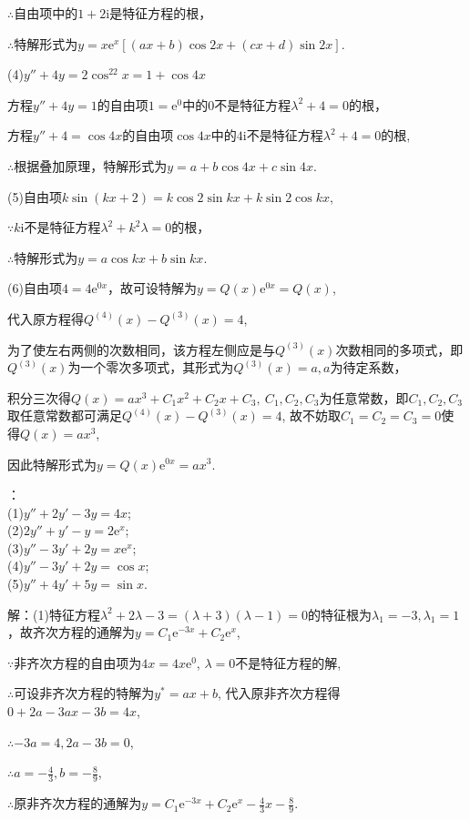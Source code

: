 \documentclass[12pt,UTF8,fleqn]{ctexart}
\newcommand{\me}[0]{\mathrm e}
\newcommand{\m}[0]{\mathrm }
\begin{document}
\begin{enumerate}
$\therefore$自由项中的$1+2\m i$是特征方程的根，

$\therefore$特解形式为$y=x\me^x[(ax+b)\cos2x+(cx+d)\sin2x]$.

(4)$y''+4y=2\cos^22x=1+\cos4x$

方程$y''+4y=1$的自由项$1=\me^0$中的$0$不是特征方程$\lambda^2+4=0$的根，

方程$y''+4=\cos4x$的自由项$\cos4x$中的$4\m i$不是特征方程$\lambda^2+4=0$的根,

$\therefore$根据叠加原理，特解形式为$y=a+b\cos4x+c\sin4x$.

(5)自由项$k\sin(kx+2)=k\cos2\sin kx+k\sin2\cos kx$,

$\because k\m i$不是特征方程$\lambda^2+k^2\lambda=0$的根，

$\therefore$特解形式为$y=a\cos kx+b\sin kx$.

(6)自由项$4=4\me^{0x}$，故可设特解为$y=Q(x)\me^{0x}=Q(x)$,

代入原方程得$Q^{(4)}(x)-Q^{(3)}(x)=4$, 

为了使左右两侧的次数相同，该方程左侧应是与$Q^{(3)}(x)$次数相同的多项式，即$Q^{(3)}(x)$为一个零次多项式，其形式为$Q^{(3)}(x)=a, a$为待定系数，

积分三次得$Q(x)=ax^3+C_1x^2+C_2x+C_3,\ C_1,C_2,C_3$为任意常数，即$C_1,C_2,C_3$取任意常数都可满足$Q^{(4)}(x)-Q^{(3)}(x)=4$, 故不妨取$C_1=C_2=C_3=0$使得$Q(x)=ax^3$,  

因此特解形式为$y=Q(x)\me^{0x}=ax^3$.

：\\
(1)$y''+2y'-3y=4x$;\\
(2)$2y''+y'-y=2\me^x$;\\
(3)$y''-3y'+2y=x\me^x$;\\
(4)$y''-3y'+2y=\cos x$;\\
(5)$y''+4y'+5y=\sin x$.

解：(1)特征方程$\lambda^2+2\lambda-3=(\lambda+3)(\lambda-1)=0$的特征根为$\lambda_1=-3,\lambda_1=1$，故齐次方程的通解为$y=C_1\me^{-3x}+C_2\me^x$,

$\because$非齐次方程的自由项为$4x=4x\me^0$, $\lambda=0$不是特征方程的解,

$\therefore$可设非齐次方程的特解为$y^*=ax+b$, 代入原非齐次方程得$0+2a-3ax-3b=4x$,

$\therefore -3a=4,2a-3b=0$,

$\therefore a=-\frac43,b=-\frac89$,

$\therefore$原非齐次方程的通解为$y=C_1\me^{-3x}+C_2\me^x-\frac43x-\frac89$.


\end{enumerate}
\end{document}

